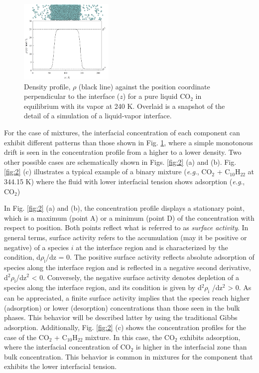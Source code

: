 \documentclass[9pt,bestpractices]{livecoms}
\begin{document}
\begin{figure}
	\centering
  \includegraphics[width=0.4\textwidth]{gfx/image1.png}
  \caption{Density profile, ${\rho}$ (black line) against the position coordinate perpendicular to the interface ($z$) for a pure liquid CO$_{2}$ in equilibrium with its vapor at 240 K. Overlaid is a snapshot of the detail of a simulation of a liquid-vapor interface.}
  \label{fig:1}
\end{figure}

For the case of mixtures, the interfacial concentration of each component can
exhibit different patterns than those shown in Fig. \ref{fig:1}, where a simple
monotonous drift is seen in the concentration profile from a higher to a lower
density. Two other possible cases are schematically shown in Figs.
\ref{fig:2} (a) and (b). Fig. \ref{fig:2} (c) illustrates a typical example of a binary mixture
(\textit{e.g}., CO$_{2}$ + C$_{10}$H$_{22}$ at 344.15 K) where the fluid with
lower interfacial tension shows adsorption (\textit{e.g}., CO$_{2}$)

In Fig. \ref{fig:2} (a) and (b), the concentration profile displays a stationary point,
which is a maximum (point A) or a minimum (point D) of the concentration with
respect to position. Both points reflect what is referred to as \textit{surface
activity}. In general terms, surface activity refers to the accumulation (may
it be positive or negative) of a species $i$ at the interface region and
is characterized by the condition, d${\rho}_{\mathrm{i}}$/dz = 0. The
positive surface activity reflects absolute adsorption of species along the
interface region and is reflected in a negative second derivative,
d$^{2}{\rho}_{\mathrm{i}}$/dz$^{2}$ {\textless} 0. Conversely, the negative
surface activity denotes depletion of a species along the interface region, and
its condition is given by d$^{2}{\rho}_{\mathrm{i}}$ /dz$^{2}$
{\textgreater} 0. As can be appreciated, a finite surface activity implies that
the species reach higher (adsorption) or lower (desorption) concentrations than
those seen in the bulk phases. This behavior will be described latter by using
the traditional Gibbs adsorption. Additionally, Fig. \ref{fig:2} (c) shows the
concentration profiles for the case of the CO$_{2}$ + C$_{10}$H$_{22}$ mixture.
In this case, the CO$_{2}$ exhibits adsorption, where the interfacial
concentration of CO$_{2}$ is higher in the interfacial zone than bulk
concentration. This behavior is common in mixtures for the component that 
exhibits the lower interfacial tension.
\end{document}
